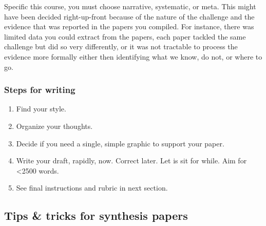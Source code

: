 \documentclass[
]{book}
\providecommand{\tightlist}{%
  \setlength{\itemsep}{0pt}\setlength{\parskip}{0pt}}
\begin{document}
Specific this course, you must choose narrative, systematic, or meta. This might have been decided right-up-front because of the nature of the challenge and the evidence that was reported in the papers you compiled. For instance, there was limited data you could extract from the papers, each paper tackled the same challenge but did so very differently, or it was not tractable to process the evidence more formally either then identifying what we know, do not, or where to go.

\hypertarget{steps-for-writing}{%
\subsubsection*{Steps for writing}\label{steps-for-writing}}

\begin{enumerate}
\def\labelenumi{\arabic{enumi}.}
\tightlist
\item
  Find your style.\\
\item
  Organize your thoughts.
\item
  Decide if you need a single, simple graphic to support your paper.\\
\item
  Write your draft, rapidly, now. Correct later. Let is sit for while. Aim for \textless2500 words.\\
\item
  See final instructions and rubric in next section.
\end{enumerate}

\hypertarget{tips-tricks-for-synthesis-papers}{%
\subsection*{Tips \& tricks for synthesis papers}\label{tips-tricks-for-synthesis-papers}}
\end{document}
